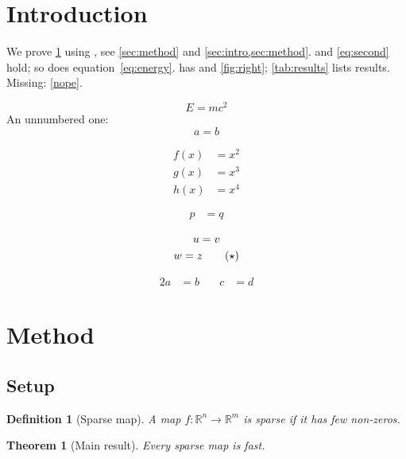 \documentclass{article}
\newtheorem{theorem}{Theorem}[section]
\newtheorem{definition}{Definition}
\newcommand{\R}{\mathbb{R}}
\begin{document}
\section{Introduction}\label{sec:intro}
We prove \cref{thm:main} using , see \autoref{sec:method} and
\cref{sec:intro,sec:method}.  and \eqref{eq:second} hold; so does
equation~\ref{eq:energy}.  has  and
\cref{fig:right}; \cref{tab:results} lists results. Missing: \ref{nope}.

\begin{equation}\label{eq:energy}
  E = mc^2
\end{equation}
An unnumbered one:
\begin{equation*}
  a = b \label{eq:ignored}
\end{equation*}

\begin{align}
  f(x) &= x^2 \label{eq:first} \\
  g(x) &= x^3 \nonumber \\
  h(x) &= x^4 \label{eq:second}
\end{align}

\begin{align*}
  p &= q
\end{align*}

\begin{gather}
  u = v \notag \\
  w = z \tag{$\star$} \label{eq:star}
\end{gather}

\begin{alignat}{2}
  a &= b &\quad c &= d
\end{alignat}

\section{Method}\label{sec:method}
\subsection{Setup}\label{sec:setup}

\begin{definition}[Sparse map]\label{def:sparse}
A map $f\colon \R^n \to \R^m$ is \emph{sparse} if it has few non-zeros.
\end{definition}

\begin{theorem}[Main result]\label{thm:main}
Every sparse map is fast.
\end{theorem}
\end{document}
